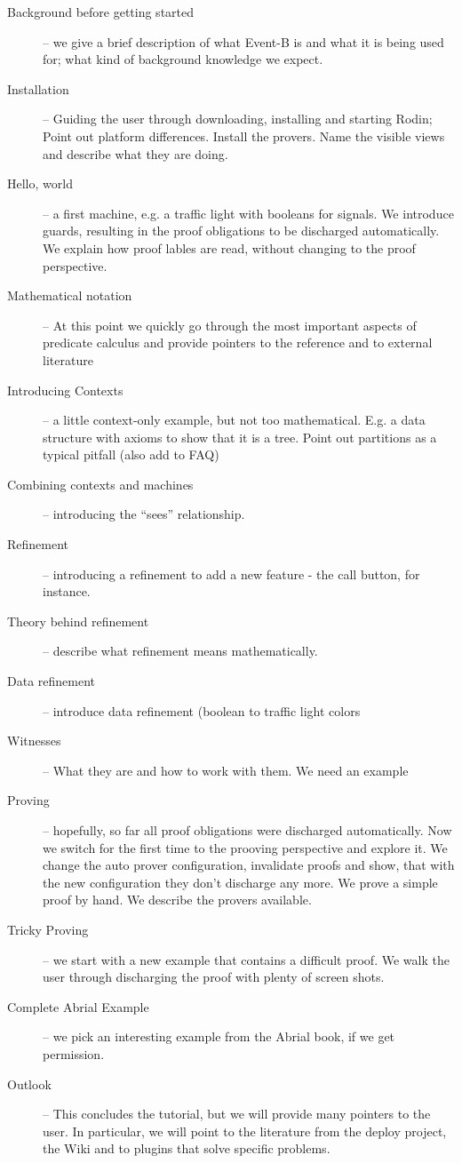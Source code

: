 \begin{description}
	\item[Background before getting started] -- we give a brief description of what Event-B is and what it is being used for; what kind of background knowledge we expect.
	\item[Installation] -- Guiding the user through downloading, installing and starting Rodin; Point out platform differences.  Install the provers.  Name the visible views and describe what they are doing.
	\item[Hello, world] -- a first machine, e.g. a traffic light with booleans for signals.  We introduce guards, resulting in the proof obligations to be discharged automatically. We explain how proof lables are read, without changing to the proof perspective.
	\item[Mathematical notation] -- At this point we quickly go through the most important aspects of predicate calculus and provide pointers to the reference and to external literature
	\item[Introducing Contexts] -- a little context-only example, but not too mathematical.  E.g. a data structure with axioms to show that it is a tree. Point out partitions as a typical pitfall (also add to FAQ)
	\item[Combining contexts and machines] -- introducing the ``sees'' relationship.
	\item[Refinement] -- introducing a refinement to add a new feature - the call button, for instance.
	\item[Theory behind refinement] -- describe what refinement means mathematically.
	\item[Data refinement] -- introduce data refinement (boolean to traffic light colors
	\item[Witnesses] -- What they are and how to work with them.  We need an example
	\item[Proving] -- hopefully, so far all proof obligations were discharged automatically.  Now we switch for the first time to the prooving perspective and explore it.  We change the auto prover configuration, invalidate proofs and show, that with the new configuration they don't discharge any more.  We prove a simple proof by hand.  We describe the provers available.
	\item[Tricky Proving] -- we start with a new example that contains a difficult proof.  We walk the user through discharging the proof with plenty of screen shots.
	\item[Complete Abrial Example] -- we pick an interesting example from the Abrial book, if we get permission.
	\item[Outlook] -- This concludes the tutorial, but we will provide many pointers to the user.  In particular, we will point to the literature from the deploy project, the Wiki and to plugins that solve specific problems.
\end{description}

